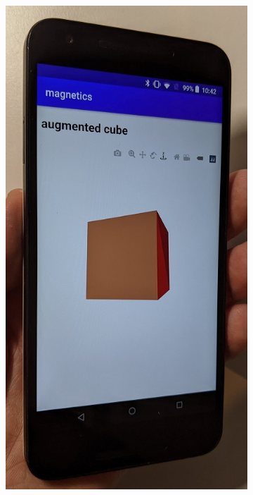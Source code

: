 \begin{figure}[hbt!]
\begin{subfigure}{0.3\textwidth}
        \includegraphics[height=1.5\linewidth]{figures/cube_right.jpg}
    \end{subfigure}
    \begin{subfigure}{0.3\textwidth}

\end{subfigure}
\end{figure}

